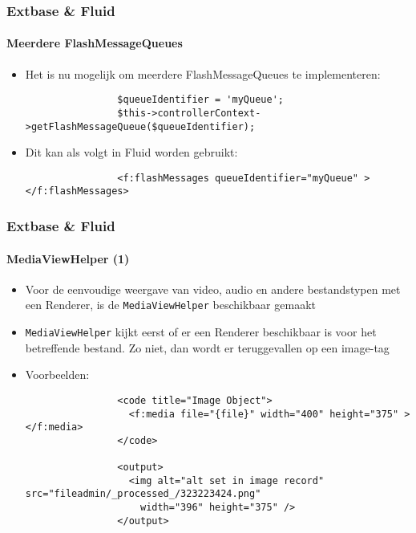 \begin{frame}[fragile]
	\frametitle{Extbase \& Fluid}
	\framesubtitle{Meerdere FlashMessageQueues}

	\begin{itemize}

		\item Het is nu mogelijk om meerdere FlashMessageQueues te implementeren:

			\begin{lstlisting}
				$queueIdentifier = 'myQueue';
				$this->controllerContext->getFlashMessageQueue($queueIdentifier);
			\end{lstlisting}

		\item Dit kan als volgt in Fluid worden gebruikt:

			\begin{lstlisting}
				<f:flashMessages queueIdentifier="myQueue" ></f:flashMessages>
			\end{lstlisting}

	\end{itemize}

\end{frame}


\begin{frame}[fragile]
	\frametitle{Extbase \& Fluid}
	\framesubtitle{MediaViewHelper (1)}

	\lstset{basicstyle=\tiny\ttfamily}

	\begin{itemize}

		\item Voor de eenvoudige weergave van video, audio en andere bestandstypen met een Renderer, 
			is de \texttt{MediaViewHelper} beschikbaar gemaakt

		\item \texttt{MediaViewHelper} kijkt eerst of er een Renderer beschikbaar is voor het betreffende 
			bestand. Zo niet, dan wordt er teruggevallen op een image-tag

		\item Voorbeelden:

			\begin{lstlisting}
				<code title="Image Object">
				  <f:media file="{file}" width="400" height="375" ></f:media>
				</code>

				<output>
				  <img alt="alt set in image record" src="fileadmin/_processed_/323223424.png"
				    width="396" height="375" />
				</output>
			\end{lstlisting}

	\end{itemize}

\end{frame}

